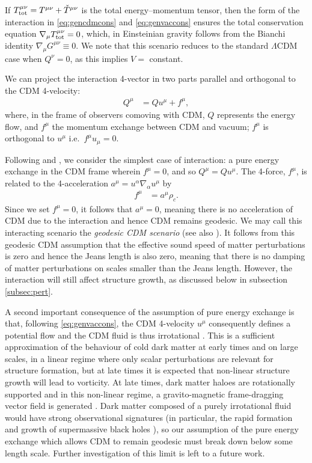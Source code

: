 \documentclass[a4paper,fleqn,usenatbib]{mnras}
\begin{document}
If $T^{\mu\nu}_{\rm tot}= T^{\mu\nu} + \check{T}^{\mu\nu}$ is the total energy--momentum tensor, then the form of the interaction in \eqref{eq:gencdmcons} and \eqref{eq:genvaccons} ensures the total conservation equation $\nabla_\mu T^{\mu\nu}_{\rm tot} =0$, which, in Einsteinian gravity follows from the Bianchi identity $\nabla_\mu G^{\mu\nu} \equiv 0$. We note that this scenario reduces to the standard $\Lambda$CDM case when $Q^\nu=0$, as this implies $V=$ constant.

We can project the interaction 4-vector in two parts parallel and orthogonal to the CDM 4-velocity:
\begin{align}
Q^\mu &= Q u^\mu + f^\mu, \label{eq:coupling}
\end{align}
where, in the frame of observers comoving with CDM, $Q$ represents the energy flow, and  $f^\mu$  the momentum exchange between CDM and  vacuum; $f^\mu$ is orthogonal to $u^\mu$ i.e.\ $f^\mu u_\mu =0$.

Following \cite{Salvatelli2014} and \cite{Wang:2014xca}, we consider the simplest case of interaction: a pure energy exchange in the CDM frame wherein $f^\mu = 0$, and so $Q^\mu = Qu^\mu$. The 4-force, $f^\mu$, is related to the 4-acceleration $a^\mu = u^\alpha \nabla_\alpha u^\mu$ by
\begin{align}
f^\mu &= a^\mu \rho_c.
\end{align}
Since we set $f^\mu =0$, it follows that $a^\mu = 0$, meaning there is no acceleration of CDM due to the interaction and hence CDM remains geodesic. We may call this interacting scenario the \textit{geodesic CDM scenario} (see also \cite{PhysRevD.87.083503}). It follows from this geodesic CDM assumption that the effective sound speed of matter perturbations is zero and hence the Jeans length is  also zero, meaning that there is no damping of matter perturbations on scales smaller than the Jeans length. However, the interaction will still affect structure growth, as discussed below in subsection \ref{subsec:pert}.

A second important consequence of the assumption of pure energy exchange is that, following \eqref{eq:genvaccons}, the CDM 4-velocity $u^\mu$ consequently defines a potential flow and the CDM fluid is thus irrotational \citep{Borges:2017jvi}. This is a sufficient approximation of the behaviour of cold dark matter at early times and on large scales, in a linear regime where only scalar perturbations are relevant for structure formation,   but at late times it is expected that non-linear structure growth will lead to vorticity. At late times, dark matter haloes are rotationally supported and in this non-linear regime, a gravito-magnetic frame-dragging vector field is generated \citep{Bruni:2013mua}. Dark matter composed of a purely irrotational fluid would have strong observational signatures (in particular, the rapid formation and growth of supermassive black holes \citep{Sawicki2013}), so our assumption of the pure energy exchange which allows CDM to remain geodesic must break down below some length scale. Further investigation of this limit is left to a future work.
\end{document}
